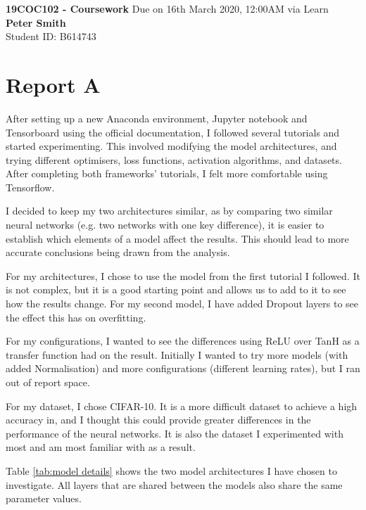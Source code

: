 \documentclass[a4paper, 11pt]{article}
\begin{document}
\noindent
\large\textbf{19COC102 - Coursework} \hfill  
\normalsize Due on 16th March 2020, 12:00AM via Learn\hfill\\
\textbf{Peter Smith} \\
\hfill Student ID: B614743

\section*{Report A}%

After setting up a new Anaconda environment, Jupyter notebook and Tensorboard using the official documentation, I followed several tutorials and started experimenting. This involved modifying the model architectures, and trying different optimisers, loss functions, activation algorithms, and datasets. After completing both frameworks' tutorials, I felt more comfortable using Tensorflow.

\vspace{5mm} %

I decided to keep my two architectures similar, as by comparing two similar neural networks (e.g. two networks with one key difference), it is easier to establish which elements of a model affect the results. This should lead to more accurate conclusions being drawn from the analysis.

For my architectures, I chose to use the model from the first tutorial I followed\cite{Tensorflow CNN Tutorial}. It is not complex, but it is a good starting point and allows us to add to it to see how the results change. For my second model, I have added Dropout layers to see the effect this has on overfitting. 

For my configurations, I wanted to see the differences using ReLU over TanH as a transfer function had on the result.
Initially I wanted to try more models (with added Normalisation) and more configurations (different learning rates), but I ran out of report space.

For my dataset, I chose CIFAR-10. It is a more difficult dataset to achieve a high accuracy in, and I thought this could provide greater differences in the performance of the neural networks. It is also the dataset I experimented with most and am most familiar with as a result.

\vspace{5mm} %

Table \ref{tab:model details} shows the two model architectures I have chosen to investigate. All layers that are shared between the models also share the same parameter values. 
\end{document}
